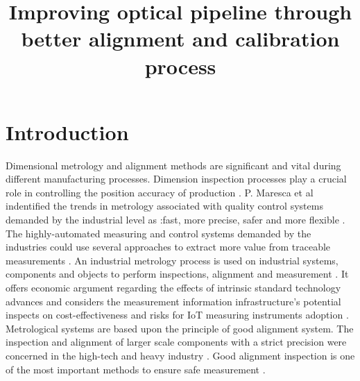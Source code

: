 \documentclass[10pt, a4paper, onecolumn]{article}
\begin{document}
	\title{Improving optical pipeline through better alignment and calibration process}
	\maketitle
	\section{Introduction}
	\label{intro}
	Dimensional metrology and alignment methods are significant and vital during different manufacturing processes. Dimension inspection processes play a crucial role in controlling the position accuracy of production \cite{gu2020study}. P. Maresca et al indentified the trends in metrology associated with quality control systems demanded by the industrial level as :fast, more precise, safer and more flexible \cite{maresca2019evaluation}. The highly-automated measuring and control systems demanded by the industries could use several approaches to extract more value from traceable measurements \cite{hall2019opportunity}. An industrial metrology process is used on industrial systems, components and objects to perform inspections, alignment and measurement \cite{chikodi2020machine}. It offers economic argument regarding the effects of intrinsic standard technology advances and considers the measurement information infrastructure's potential inspects on cost-effectiveness and risks for IoT measuring instruments adoption \cite{kuster2020measurement}. Metrological systems are based upon the principle of good alignment system. The inspection and alignment of larger scale components with a strict precision were concerned in the high-tech and heavy industry \cite{gu2020study}. Good alignment inspection is one of the most important methods to ensure safe measurement \cite{peng2020inertial}.
	
	\newpage
	
	
\end{document}
